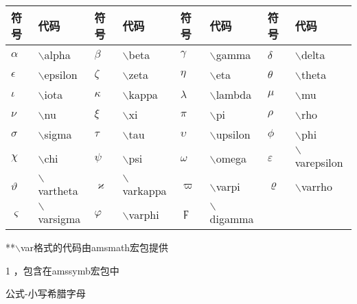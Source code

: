 \documentclass[UTF8,fontset=ubuntu]{ctexart}
\begin{document}
\begin{threeparttable}
\begin{tabular}{l l l l l l l l}
	\hline
	符号 & 代码 & 符号 & 代码 & 符号 & 代码 & 符号 & 代码\\
	\hline
	$\alpha$ & $\backslash$alpha & $\beta$ & $\backslash$beta & $\gamma$ & $\backslash$gamma & $\delta$ & $\backslash$delta\\
	$\epsilon$ & $\backslash$epsilon & $\zeta$ & $\backslash$zeta & $\eta$ & $\backslash$eta & $\theta$ & $\backslash$theta\\
	$\iota$ & $\backslash$iota & $\kappa$ & $\backslash$kappa & $\lambda$ & $\backslash$lambda & $\mu$ & $\backslash$mu\\
	$\nu$ & $\backslash$nu & $\xi$ & $\backslash$xi & $\pi$ & $\backslash$pi & $\rho$ & $\backslash$rho\\
	$\sigma$ & $\backslash$sigma & $\tau$ & $\backslash$tau & $\upsilon$ & $\backslash$upsilon & $\phi$ & $\backslash$phi\\
	$\chi$ & $\backslash$chi & $\psi$ & $\backslash$psi & $\omega$ & $\backslash$omega & $\varepsilon$ & $\backslash$varepsilon\\
	$\vartheta$ & $\backslash$vartheta & $\varkappa$ & $\backslash$varkappa\tnote{1} & $\varpi$ & $\backslash$varpi & $\varrho$ & $\backslash$varrho\tnote{1}\\
	$\varsigma$ & $\backslash$varsigma & $\varphi$ & $\backslash$varphi & $\digamma$ & $\backslash$digamma\tnote{1}\\
	\hline
\end{tabular}
**$\backslash$var格式的代码由amsmath宏包提供
\begin{tablenotes}
	\item[1] ，包含在amssymb宏包中
\end{tablenotes}
\caption{公式-小写希腊字母}
\end{threeparttable}
\end{document}
